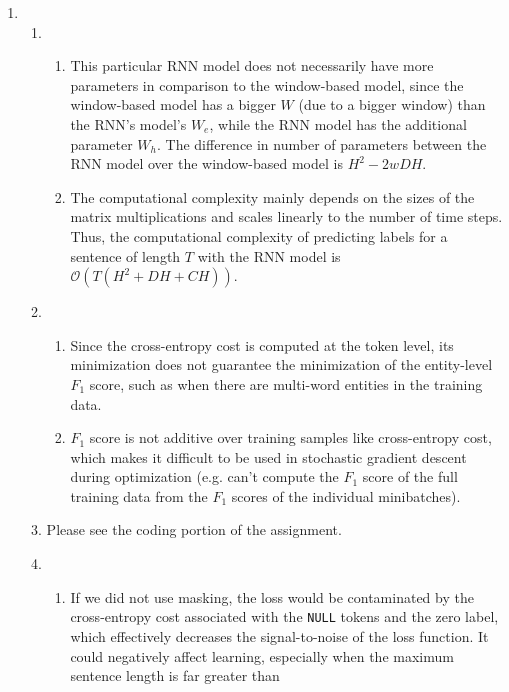 \documentclass[10pt,reqno]{amsart}
\begin{document}
\begin{enumerate}[topsep=0pt,itemsep=3ex,partopsep=1ex,parsep=1ex]
\item
  \begin{enumerate}[itemsep=2ex]
  \item 
    \begin{enumerate}[itemsep=2ex]
      \item This particular RNN model does not necessarily have more parameters in 
        comparison to the window-based model, since the window-based model has a 
        bigger $W$ (due to a bigger window) than the RNN's model's $W_e$, while the RNN model 
        has the additional parameter $W_h$.
        The difference in number of parameters between the RNN model over 
        the window-based model is $H^2 - 2wDH$.
      \item The computational complexity mainly depends on the sizes of the 
        matrix multiplications and scales linearly to the number of time steps.
        Thus, the computational complexity of predicting labels for a sentence of length $T$
        with the RNN model is $\mathcal{O}(T(H^2+DH+CH))$.
    \end{enumerate}
  \item 
    \begin{enumerate}[itemsep=2ex]
      \item Since the cross-entropy cost is computed at the token level, its minimization
        does not guarantee the minimization of the entity-level $F_1$ score, such as when there 
        are multi-word entities in the training data. 
      \item $F_1$ score is not additive over training samples like cross-entropy cost, which makes 
        it difficult to be used in stochastic gradient descent during optimization (e.g. can't 
        compute the $F_1$ score of the full training data from the $F_1$ scores of the individual minibatches).
    \end{enumerate}
  \item Please see the coding portion of the assignment.
  \item 
    \begin{enumerate}[itemsep=2ex]
      \item If we did not use masking, the loss would be contaminated by the cross-entropy cost 
        associated with the \texttt{NULL} tokens and the zero label, which effectively decreases the signal-to-noise 
        of the loss function. It could negatively affect learning, especially  when the maximum sentence length is far greater than 

\end{enumerate}
\end{enumerate}
\end{enumerate}
\end{document}
